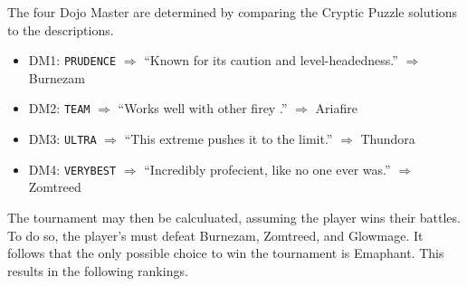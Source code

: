 The four Dojo Master \mappMobimon{} are determined by comparing the
Cryptic Puzzle solutions to the \mappMobidex{} descriptions.

\begin{itemize}
  \item DM1: \texttt{PRUDENCE} \(\Rightarrow\)
        ``Known for its caution and level-headedness.'' \(\Rightarrow\)
        Burnezam
  \item DM2: \texttt{TEAM} \(\Rightarrow\)
        ``Works well with other firey \mappMobimon{}.'' \(\Rightarrow\)
        Ariafire
  \item DM3: \texttt{ULTRA} \(\Rightarrow\)
        ``This extreme \mappMobimon{} pushes it to the limit.'' \(\Rightarrow\)
        Thundora
  \item DM4: \texttt{VERYBEST} \(\Rightarrow\)
        ``Incredibly profecient, like no one ever was.'' \(\Rightarrow\)
        Zomtreed
\end{itemize}

The tournament may then be calculuated, assuming the player wins their battles.
To do so, the player's \mappMobimon{} must defeat Burnezam, Zomtreed, and
Glowmage. It follows that the only possible choice to win the tournament is
Emaphant. This results in the following rankings.

\begin{center}
\end{center}

